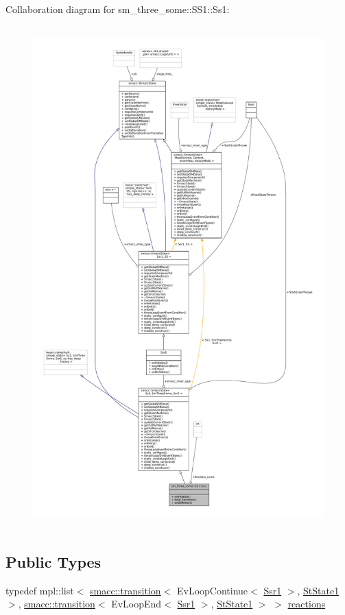 Collaboration diagram for sm\+\_\+three\+\_\+some\+:\+:S\+S1\+:\+:Ss1\+:
\nopagebreak
\begin{figure}[H]
\begin{center}
\leavevmode
\includegraphics[height=550pt]{structsm__three__some_1_1SS1_1_1Ss1__coll__graph}
\end{center}
\end{figure}
\subsection*{Public Types}
\begin{DoxyCompactItemize}
\item 
typedef mpl\+::list$<$ \hyperlink{classsmacc_1_1transition}{smacc\+::transition}$<$ Ev\+Loop\+Continue$<$ \hyperlink{structSsr1}{Ssr1} $>$, \hyperlink{structsm__three__some_1_1StState1}{St\+State1} $>$, \hyperlink{classsmacc_1_1transition}{smacc\+::transition}$<$ Ev\+Loop\+End$<$ \hyperlink{structSsr1}{Ssr1} $>$, \hyperlink{structsm__three__some_1_1StState1}{St\+State1} $>$ $>$ \hyperlink{structsm__three__some_1_1SS1_1_1Ss1_afe5ddf0e92947dde03a8432c6076f12a}{reactions}
\end{DoxyCompactItemize}
